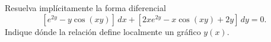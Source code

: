 Resuelva implícitamente la forma diferencial
\[[e^{2y}-y\cos(xy)]\,dx+[2xe^{2y}-x\cos(xy)+2y]\,dy=0.\]
Indique dónde la relación define localmente un gráfico $y(x)$.
